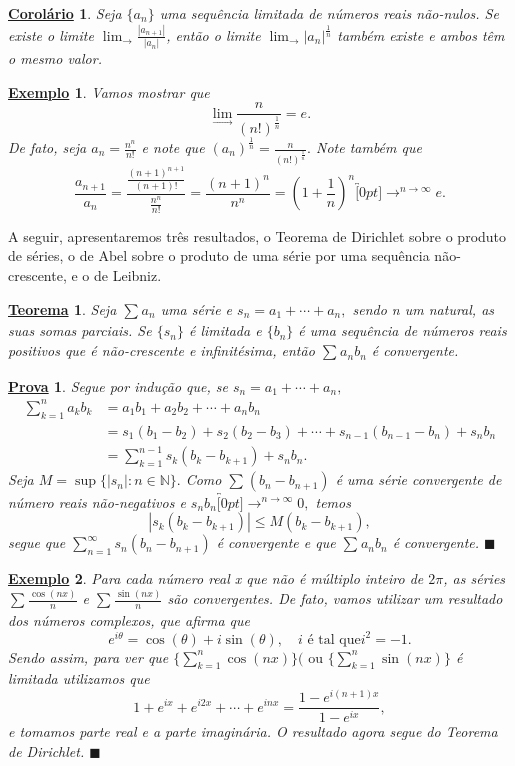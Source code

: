 \documentclass{article}
\newtheorem*{theorem*}{\underline{Teorema}}
\newtheorem{example}{\underline{Exemplo}}
\newtheorem*{proof*}{\underline{Prova}}
\newtheorem*{crl*}{\underline{Corol\'ario}}
\renewcommand\qedsymbol{$\blacksquare$}
\begin{document}
\begin{crl*}
  Seja $\{a_{n}\}$ uma sequ\^encia limitada de n\'umeros reais n\~ao-nulos. Se existe o limite $\lim_{\to}\frac{|a_{n+1}|}{|a_{n}|}$,
ent\~ao o limite $\lim_{\to}|a_{n}|^{\frac{1}{n}}$ tamb\'em existe e ambos t\^em o mesmo valor.
\end{crl*}
\begin{example}
  Vamos mostrar que 
    $$
      \lim_{\to}\frac{n}{(n!)^{\frac{1}{n}}}=e.
    $$
  De fato, seja $a_{n}=\frac{n^{n}}{n!}$ e note que $(a_{n})^{\frac{1}{n}} = \frac{n}{(n!)^{\frac{1}{n}}}.$ Note tamb\'em que 
    $$
      \frac{a_{n+1}}{a_{n}} = \frac{\frac{(n+1)^{n+1}}{(n+1)!}}{\frac{n^{n}}{n!}} = \frac{(n+1)^{n}}{n^{n}} = (1+\frac{1}{n})^{n}\overbracket[0pt]{\longrightarrow}^{n\to \infty}e.
    $$
\end{example}
  A seguir, apresentaremos tr\^es resultados, o Teorema de Dirichlet sobre o produto de s\'eries, o de Abel sobre o produto de
uma s\'erie por uma sequ\^encia n\~ao-crescente, e o de Leibniz.
\begin{theorem*}
  Seja $\sum\limits_{}^{}a_{n}$ uma s\'erie e $s_{n} = a_{1} + \cdots + a_{n},$ sendo n um natural, as suas somas parciais.
  Se $\{s_{n}\}$ \'e limitada e $\{b_{n}\}$ \'e uma sequ\^encia de n\'umeros reais positivos que \'e n\~ao-crescente e infinit\'esima,
ent\~ao $\sum\limits_{}^{}a_{n}b_{n}$ \'e convergente.
\end{theorem*}
\begin{proof*}
  Segue por indu\c c\~ao que, se $s_{n} = a_{1}+\cdots+a_{n},$
  \begin{align*}
    \sum\limits_{k=1}^{n}a_{k}b_{k} &= a_{1}b_{1} + a_{2}b_{2}+\cdots + a_{n}b_{n}\\
                                    &= s_{1}(b_{1}-b_{2})+s_{2}(b_{2}-b_{3})+\cdots+s_{n-1}(b_{n-1}-b_{n})+s_{n}b_{n}\\
                                    &=\sum\limits_{k=1}^{n-1}s_{k}(b_{k}-b_{k+1}) + s_{n}b_{n}.
  \end{align*}
  Seja $M=\sup{\{|s_{n}|:n\in \mathbb{N}\}}.$ Como $\sum\limits_{}^{}(b_{n}-b_{n+1})$ \'e uma s\'erie convergente de n\'umero reais n\~ao-negativos
e $s_{n}b_{n}\overbracket[0pt]{\longrightarrow}^{n\to \infty}0,$ temos 
  $$
    |s_{k}(b_{k}-b_{k+1})| \leq{M(b_{k}-b_{k+1})},
  $$
  segue que $\sum\limits_{n=1}^{\infty}s_{n}(b_{n}-b_{n+1})$ \'e convergente e que $\sum\limits_{}^{}a_{n}b_{n}$ \'e convergente. \qedsymbol
\end{proof*}
\begin{example}
  Para cada n\'umero real x que n\~ao \'e m\'ultiplo inteiro de $2\pi$, as s\'eries $\sum\limits_{}^{}\frac{\cos{(nx)}}{n}$ e $\sum\limits_{}^{}\frac{\sin{(nx)}}{n}$
  s\~ao convergentes. De fato, vamos utilizar um resultado dos n\'umeros complexos, que afirma que 
    $$
    e^{i\theta} = \cos{(\theta)} + i\sin{(\theta)},\quad i\text{ \'e tal que} i^{2} = -1.
    $$
    Sendo assim, para ver que $\{\sum\limits_{k=1}^{n}\cos{(nx)}\}(\text{ ou }\{\sum\limits_{k=1}^{n}\sin{(nx)}\}$ \'e limitada
  utilizamos que 
    $$
      1 + e^{ix} + e^{i2x} + \cdots + e^{inx} = \frac{1 - e^{i(n+1)x}}{1-e^{ix}},
    $$
    e tomamos parte real e a parte imagin\'aria. O resultado agora segue do Teorema de Dirichlet. \qedsymbol
\end{example}
\end{document}
